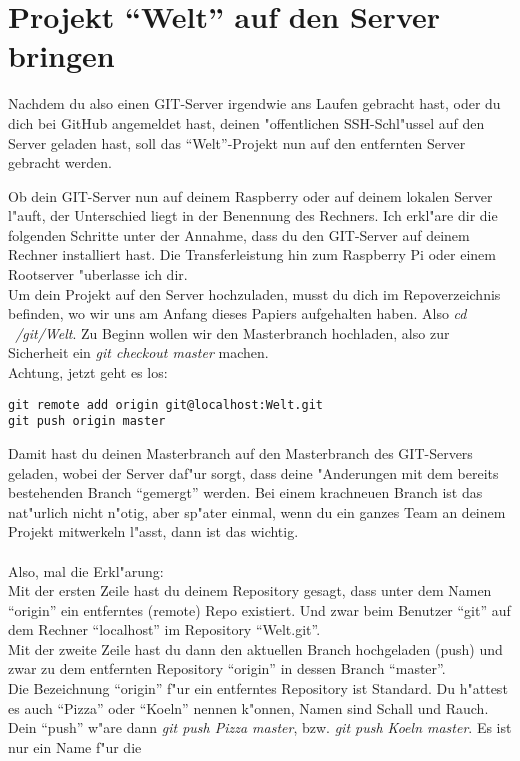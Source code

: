 \documentclass[german,a4paper]{report}
\begin{document}
\chapter{Projekt ``Welt'' auf den Server bringen}
Nachdem du also einen GIT-Server irgendwie ans Laufen gebracht hast, oder du dich bei GitHub
angemeldet hast, deinen "offentlichen SSH-Schl"ussel auf den Server geladen hast, soll das
``Welt''-Projekt nun auf den entfernten Server gebracht werden.

Ob dein GIT-Server nun auf deinem Raspberry oder auf deinem lokalen Server l"auft, der Unterschied
liegt in der Benennung des Rechners. Ich erkl"are dir die folgenden Schritte unter der Annahme,
dass du den GIT-Server auf deinem Rechner installiert hast. Die Transferleistung hin zum
Raspberry Pi oder einem Rootserver "uberlasse ich dir.\\
Um dein Projekt auf den Server hochzuladen, musst du dich im Repoverzeichnis befinden, wo wir uns am
Anfang dieses Papiers aufgehalten haben. Also \textit{cd ~/git/Welt}. Zu Beginn wollen wir
den Masterbranch hochladen, also zur Sicherheit ein \textit{git checkout master} machen.\\
Achtung, jetzt geht es los:\\
\begin{verbatim}
git remote add origin git@localhost:Welt.git
git push origin master
\end{verbatim}
Damit hast du deinen Masterbranch auf den Masterbranch des GIT-Servers geladen, wobei der Server
daf"ur sorgt, dass deine "Anderungen mit dem bereits bestehenden Branch ``gemergt'' werden.
Bei einem krachneuen Branch ist das nat"urlich nicht n"otig, aber sp"ater einmal, wenn du
ein ganzes Team an deinem Projekt mitwerkeln l"asst, dann ist das wichtig.\\
\\
Also, mal die Erkl"arung:\\
Mit der ersten Zeile hast du deinem Repository gesagt, dass unter dem Namen ``origin'' ein
entferntes (remote) Repo existiert. Und zwar beim Benutzer ``git'' auf dem Rechner ``localhost''
im Repository ``Welt.git''.\\
Mit der zweite Zeile hast du dann den aktuellen Branch hochgeladen (push) und zwar zu dem
entfernten Repository ``origin'' in dessen Branch ``master''.\\
Die Bezeichnung ``origin'' f"ur ein entferntes Repository ist Standard. Du h"attest es auch
``Pizza'' oder ``Koeln'' nennen k"onnen, Namen sind Schall und Rauch. Dein ``push'' w"are dann
\textit{git push Pizza master}, bzw. \textit{git push Koeln master}. Es ist nur ein Name f"ur die
\end{document}
